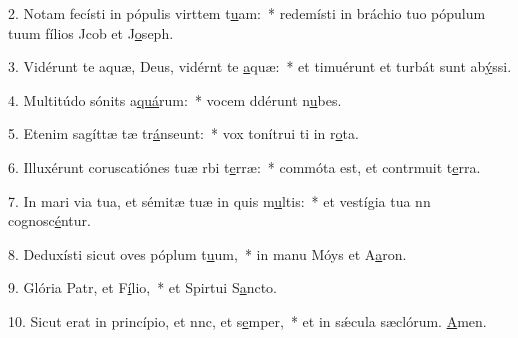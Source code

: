 2. Notam fecísti in pópulis virttem t\uline{u}am:~* redemísti in bráchio tuo pópulum tuum fílios Jcob et J\uline{o}seph.\par 
3. Vidérunt te aquæ, Deus, vidérnt te \uline{a}quæ:~* et timuérunt et turbát sunt ab\uline{ý}ssi.\par 
4. Multitúdo sónits a\uline{quá}rum:~* vocem ddérunt n\uline{u}bes.\par 
5. Etenim sagíttæ tæ tr\uline{á}nseunt:~* vox tonítrui ti in r\uline{o}ta.\par 
6. Illuxérunt coruscatiónes tuæ rbi t\uline{e}rræ:~* commóta est, et contrmuit t\uline{e}rra.\par 
7. In mari via tua, et sémitæ tuæ in quis m\uline{u}ltis:~* et vestígia tua nn cognosc\uline{é}ntur.\par 
8. Deduxísti sicut oves póplum t\uline{u}um,~* in manu Móys et A\uline{a}ron.\par 
9. Glória Patr, et F\uline{í}lio,~* et Spirtui S\uline{a}ncto.\par 
10. Sicut erat in princípio, et nnc, et s\uline{e}mper,~* et in sǽcula sæclórum. \uline{A}men.\par 
